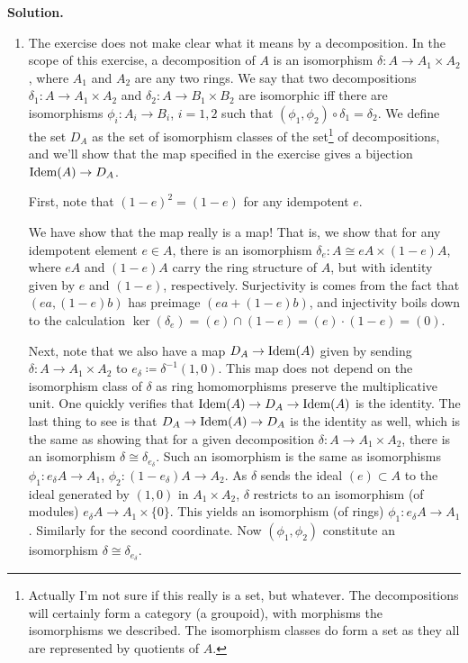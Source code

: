 \documentclass[a4paper,11pt]{article}
\begin{document}
\textbf{Solution.}
\begin{enumerate}
    \item The exercise does not make clear what it means by a decomposition. In
        the scope of this exercise, a decomposition of $A$ is an
        isomorphism $\delta : A \to A_1 \times A_2$, where 
        $A_1$ and $A_2$ are any two rings. We say that two decompositions
        $\delta_1: A \to A_1 \times A_2$ and $\delta_2: A \to B_1 \times B_2$
        are isomorphic iff there are isomorphisms
        $\phi_i : A_i \to B_i$, $i = 1,2$ such that $(\phi_1, \phi_2) \circ
        \delta_1 = \delta_2$. We define the set $D_A$ as the set of isomorphism
        classes of the set\footnote{Actually I'm not sure if this really is a
        set, but whatever.  The decompositions will certainly form a category
        (a groupoid), with morphisms the isomorphisms we described. The
        isomorphism classes do form a set as they all are represented by quotients
        of $A$.} of decompositions, and we'll show that the map specified in the
        exercise gives a bijection $\operatorname{Idem}(A) \to D_A$. 

        First, note that $(1-e)^2 = (1-e)$ for any idempotent $e$. 

        We have show that the map really is a map! That is, we show
        that for any idempotent element $e \in A$, there is an isomorphism
        $\delta_e: A \cong eA \times (1-e)A$, where $eA$ and $(1-e)A$ carry the
        ring structure of $A$, but with identity given by $e$ and $(1-e)$,
        respectively. Surjectivity is comes from the fact that $(ea, (1-e)b)$ has
        preimage $(ea + (1-e)b)$, and injectivity boils down to the 
        calculation $\ker(\delta_e) = (e) \cap (1-e) = (e)\cdot(1-e) = (0)$. 

        Next, note that we also have a map $D_A \to \operatorname{Idem}(A)$ given by sending
        $\delta: A \to A_1 \times A_2$ to $e_\delta \coloneqq \delta^{-1}(1,0)$. 
        This map does not depend on the isomorphism class of $\delta$ as ring
        homomorphisms preserve the multiplicative unit. One quickly verifies that
        $\operatorname{Idem}(A) \to D_A \to \operatorname{Idem}(A)$ is the identity. The last thing to see 
        is that $D_A \to \operatorname{Idem}(A) \to D_A$ is the identity as well, which is the 
        same as showing that for a given decomposition $\delta: A \to A_1
        \times A_2$, there is an isomorphism $\delta \cong \delta_{e_\delta}$. 
        Such an isomorphism is the same as isomorphisms $\phi_1 : e_\delta A
        \to A_1$, $\phi_2: (1-e_\delta)A \to A_2$. As $\delta$ sends the ideal
        $(e) \subset A$ to the ideal generated by $(1,0)$ in $A_1 \times A_2$,
        $\delta$ restricts to an isomorphism (of modules) $e_\delta A \to A_1
        \times \{0\}$. This yields an isomorphism (of rings) $\phi_1: e_\delta
        A \to A_1$. Similarly for the second coordinate. Now $(\phi_1, \phi_2)$
        constitute an isomorphism $\delta \cong \delta_{e_\delta}$. 


\end{enumerate}
\end{document}
